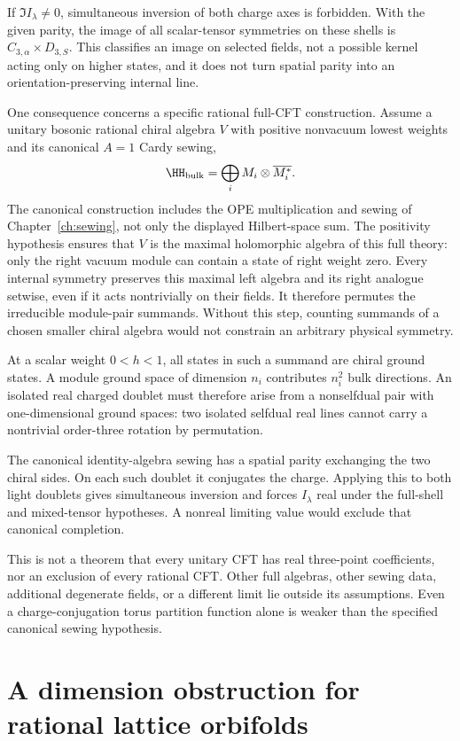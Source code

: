 If $\Im I_\lambda\ne0$, simultaneous inversion of both charge axes
is forbidden. With the given parity, the image of all scalar-tensor
symmetries on these shells is $C_{3,\alpha}\times D_{3,S}$.
This classifies an image on selected fields, not a possible kernel
acting only on higher states, and it does not turn spatial parity
into an orientation-preserving internal line.

One consequence concerns a specific rational full-CFT construction.
Assume a unitary bosonic rational chiral algebra $V$ with positive
nonvacuum lowest weights and its canonical $A=1$ Cardy sewing,
\[
 \HH_{\rm bulk}=\bigoplus_iM_i\otimes\overline{M_i^*}.
\]
The canonical construction includes the OPE multiplication and sewing
of Chapter~\ref{ch:sewing}, not only the displayed Hilbert-space sum.
The positivity hypothesis ensures that $V$ is the maximal
holomorphic algebra of this full theory: only the right vacuum
module can contain a state of right weight zero. Every internal
symmetry preserves this maximal left algebra and its right analogue
setwise, even if it acts nontrivially on their fields. It therefore
permutes the irreducible module-pair summands. Without this step,
counting summands of a chosen smaller chiral algebra would not
constrain an arbitrary physical symmetry.

At a scalar weight $0<h<1$, all states in such a summand are
chiral ground states. A module ground space of dimension $n_i$
contributes $n_i^2$ bulk directions. An isolated real charged
doublet must therefore arise from a nonselfdual pair with
one-dimensional ground spaces: two isolated selfdual real lines
cannot carry a nontrivial order-three rotation by permutation.

The canonical identity-algebra sewing has a spatial parity
exchanging the two chiral sides. On each such doublet it conjugates
the charge. Applying this to both light doublets gives simultaneous
inversion and forces $I_\lambda$ real under the full-shell and
mixed-tensor hypotheses. A nonreal limiting value would exclude
that canonical completion.

This is not a theorem that every unitary CFT has real three-point
coefficients, nor an exclusion of every rational CFT. Other full
algebras, other sewing data, additional degenerate fields, or a
different limit lie outside its assumptions. Even a charge-conjugation
torus partition function alone is weaker than the specified canonical
sewing hypothesis.

\section{A dimension obstruction for rational lattice orbifolds}

